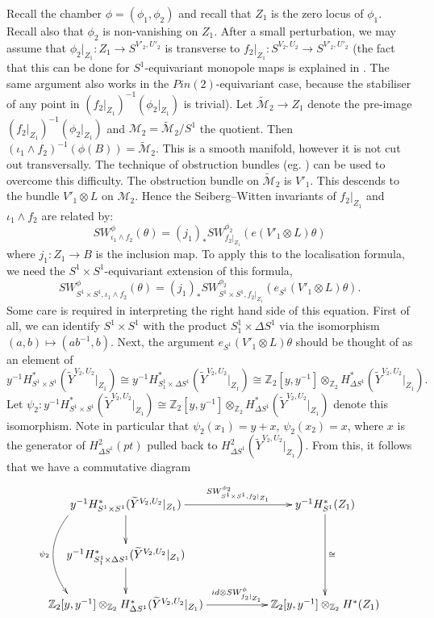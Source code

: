 \documentclass{amsart}
\theoremstyle{definition}
\theoremstyle{remark}
\numberwithin{equation}{section}
\begin{document}
Recall the chamber $\phi = (\phi_1 , \phi_2)$ and recall that $Z_1$ is the zero locus of $\phi_1$. Recall also that $\phi_2$ is non-vanishing on $Z_1$. After a small perturbation, we may assume that $\phi_2|_{Z_1} : Z_1 \to S^{V'_2,U'_2}$ is transverse to $f_2|_{Z_1} : S^{V_2,U_2} \to S^{V'_2 , U'_2}$ (the fact that this can be done for $S^1$-equivariant monopole maps is explained in \cite[Pages 522-523]{bk}. The same argument also works in the $Pin(2)$-equivariant case, because the stabiliser of any point in $(f_2|_{Z_1})^{-1}( \phi_2|_{Z_1})$ is trivial). Let $\widetilde{\mathcal{M}}_2 \to Z_1$ denote the pre-image $(f_2|_{Z_1})^{-1}( \phi_2|_{Z_1})$ and $\mathcal{M}_2 = \widetilde{\mathcal{M}}_2/S^1$ the quotient. Then $(\iota_1 \wedge f_2)^{-1}(\phi(B)) = \widetilde{\mathcal{M}}_2$. This is a smooth manifold, however it is not cut out transversally. The technique of obstruction bundles (eg. \cite[Section 3]{fm}) can be used to overcome this difficulty. The obstruction bundle on $\widetilde{\mathcal{M}}_2$ is $V'_1$. This descends to the bundle $V'_1 \otimes L$ on $\mathcal{M}_2$. Hence the Seiberg--Witten invariants of $f_2|_{Z_1}$ and $\iota_1 \wedge f_2$ are related by:
\[
SW^\phi_{\iota_1 \wedge f_2}( \theta ) = (j_1)_* SW^{\phi_2}_{f_2|_{Z_1}}( e(V'_1 \otimes L) \theta )
\]
where $j_1 : Z_1 \to B$ is the inclusion map. To apply this to the localisation formula, we need the $S^1 \times S^1$-equivariant extension of this formula,
\[
SW^\phi_{S^1 \times S^1 , \iota_1 \wedge f_2}( \theta ) = (j_1)_* SW^{\phi_2}_{S^1 \times S^1 , f_2|_{Z_1}}( e_{S^1}(V'_1 \otimes L) \theta ).
\]
Some care is required in interpreting the right hand side of this equation. First of all, we can identify $S^1 \times S^1$ with the product $S^1_1 \times \Delta S^1$ via the isomorphism $(a,b) \mapsto (ab^{-1} , b)$. Next, the argument $e_{S^1}(V'_1 \otimes L) \theta$ should be thought of as an element of
\[
y^{-1} H^*_{S^1 \times S^1}( \widetilde{Y}^{V_2,U_2}|_{Z_1}) \cong y^{-1} H^*_{S^1_1 \times \Delta S^1}(\widetilde{Y}^{V_2,U_2}|_{Z_1}) \cong \mathbb{Z}_2[y,y^{-1}] \otimes_{\mathbb{Z}_2} H^*_{\Delta S^1}(\widetilde{Y}^{V_2,U_2}|_{Z_1}).
\]
Let $\psi_2 : y^{-1} H^*_{S^1 \times S^1}(\widetilde{Y}^{V_2,U_2}|_{Z_1}) \cong \mathbb{Z}_2[y,y^{-1}] \otimes_{\mathbb{Z}_2} H^*_{\Delta S^1}(\widetilde{Y}^{V_2,U_2}|_{Z_1})$ denote this isomorphism. Note in particular that $\psi_2(x_1) = y+x$, $\psi_2(x_2) = x$, where $x$ is the generator of $H^2_{\Delta S^1}(pt)$ pulled back to $H^2_{\Delta S^1}(\widetilde{Y}^{V_2,U_2}|_{Z_1})$. From this, it follows that we have a commutative diagram
\[
\xymatrix{
y^{-1} H^*_{S^1 \times S^1}(\widetilde{Y}^{V_2,U_2}|_{Z_1}) \ar[d] \ar[rr]^-{SW^{\phi_2}_{S^1 \times S^1 , f_2|_{Z_1}}} \ar@/_1.8pc/ @<-10ex>[dd]_-{\psi_2} & & y^{-1}H^*_{S^1}(Z_1) \ar[dd]^-{\cong} \\
y^{-1} H^*_{S^1_1 \times \Delta S^1}(\widetilde{Y}^{V_2,U_2}|_{Z_1}) \ar[d] & & \\
\mathbb{Z}_2[y,y^{-1}] \otimes_{\mathbb{Z}_2} H^*_{\Delta S^1}(\widetilde{Y}^{V_2,U_2}|_{Z_1}) \ar[rr]^-{id \otimes SW^\phi_{f_2|_{Z_1}}} & & \mathbb{Z}_2[y,y^{-1}] \otimes_{\mathbb{Z}_2} H^*(Z_1)
}
\]
\end{document}
